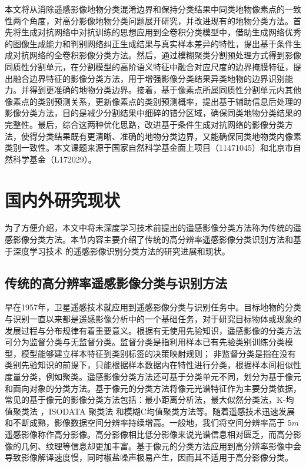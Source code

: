 本文将从消除遥感影像地物分类混淆边界和保持分类结果中同类地物像素点的一致性两个角度，对高分影像地物分类问题展开研究，并改进现有的地物分类方法。首先将生成对抗网络中对抗训练的思想应用到全卷积分类模型中，借助生成网络优秀的图像生成能力和判别网络纠正生成结果与真实样本差异的特性，提出基于条件生成对抗网络的全卷积影像分类方法。然后，通过模糊聚类分割预处理方式得到影像同质性分割单元，在分割模型的高阶语义特征中融合对应尺度的边界掩膜特征，提出融合边界特征的影像分类方法，用于增强影像分类结果异类地物的边界识别能力。并得到更准确的地物分类边界。接着，基于像素点所属同质性分割单元内其他像素点的类别预测关系，更新像素点的类别预测概率，提出基于辅助信息后处理的影像分类方法，目的是减少分割结果中细碎的错分区域，确保同类地物分类结果的完整性。最后，综合这两种优化思路，改进基于条件生成对抗网络的影像分类方法，使得分类结果既有更清晰、准确的地物分类边界，又能确保同类地物类内像素类别一致性。本文课题来源于国家自然科学基金面上项目（11471045）和北京市自然科学基金（L172029）。




\section{国内外研究现状}
\label{sec:second}
为了方便介绍，本文中将未深度学习技术前提出的遥感影像分类方法称为传统的遥感影像分类方法。本节内容主要介绍了传统的高分辨率遥感影像分类识别方法和基于深度学习技术\citep{hinton2006fast, bengio2009learning, NIPS2012_4824} 的遥感影像识别分类方法的研究进展和现状。

\subsection{传统的高分辨率遥感影像分类与识别方法}
\label{subsec:1-2-1}
早在1957年，卫星遥感技术就应用到遥感影像分类与识别任务中。目标地物的分类与识别一直以来都是遥感影像分析中的一个基础任务，对于研究目标物体或现象的发展过程与分布规律有着重要意义\cite{jensen1987introductory}。根据有无使用先验知识，遥感影像的分类方法可分为监督分类与无监督分类。监督分类是指利用样本已有先验类别训练分类模型，模型能够建立样本特征到类别标签的决策映射规则； 非监督分类是指在没有类别先验知识的前提下，只能根据样本数据内在特性进行分类，根据样本间相似性度量分类，例如聚类\cite{djukanovic1993unsupervised}。遥感影像分类方法还可基于分类单元不同，划分为基于像元和面向对象的分类方法。基于像元的分类方法将像元光谱特征作为主要分类依据，常见的基于像元的影像分类方法包括：最小距离分析法\cite{wacker1972minimum}，最大似然分类法\cite{strahler1980use}，K-均值聚类法\cite{atkinson2000geostatistical} ，ISODATA 聚类法\cite{paul2002new} 和模糊C均值聚类方法\cite{bezdek1984fcm}等。随着遥感技术迅速发展和不断成熟，影像数据空间分辨率持续增高。一般地，我们将空间分辨率高于 $5m$ 遥感影像称作高分影像\cite{zhangyongsheng2004}。高分影像相比低分影像来说光谱信息相对匮乏，而高分影像的几何、纹理等信息却更加丰富。基于像元的分类方法应用到高分辨率影像中会导致影像解译速度慢，同时椒盐噪声极易产生，因而其不适用于高分影像分类\cite{blaschke2010object}。


